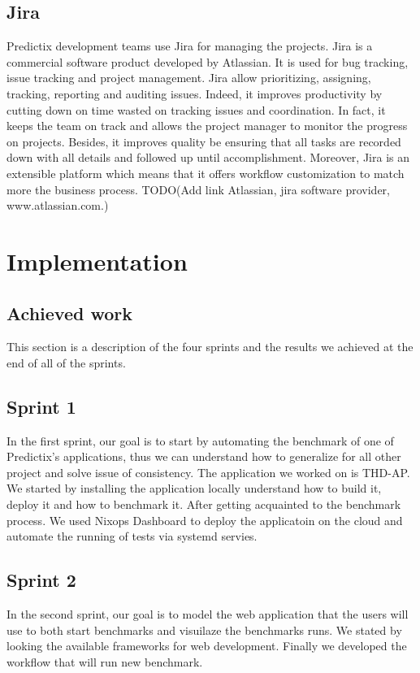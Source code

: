 \subsection{Jira}
Predictix development teams use Jira for managing the projects. Jira is a
commercial software product developed by Atlassian. It is used for bug tracking,
issue tracking and project management. Jira allow prioritizing, assigning,
tracking, reporting and auditing issues. Indeed, it improves productivity by
cutting down on time wasted on tracking issues and coordination. In fact, it
keeps the team on track and allows the project manager to monitor the progress
on projects. Besides, it improves quality be ensuring that all tasks are
recorded down with all details and followed up until accomplishment. Moreover,
Jira is an extensible platform which means that it offers workflow customization
to match more the business process. TODO(Add link Atlassian, jira software
provider, www.atlassian.com.)


\section{Implementation}
\subsection{Achieved work}
This section is a description of the four sprints and the results we achieved at
the end of all of the sprints.
\subsection{Sprint 1}
In the first sprint, our goal is to start by automating the benchmark of one of
Predictix's applications, thus we can understand how to generalize for all other
project and solve issue of consistency. The application we worked on is THD-AP.
We started by installing the application locally understand how to build it,
deploy it and how to benchmark it. After getting acquainted to the benchmark
process. We used Nixops Dashboard to deploy the applicatoin on the cloud and
automate the running of tests via systemd servies.

\subsection{Sprint 2}
In the second sprint, our goal is to model the web application that the users
will use to both start benchmarks and visuilaze the benchmarks runs. We stated
by looking the available frameworks for web development. Finally we developed
the workflow that will run new benchmark.

